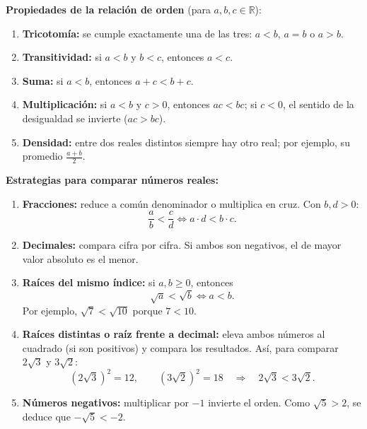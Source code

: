 \documentclass[12pt, letterpaper]{article}
\begin{document}
\begin{cuadroteoria}
  \textbf{Propiedades de la relación de orden} (para $a, b, c \in \mathbb{R}$):
  \begin{enumerate}[leftmargin=*, label=\arabic*.]
    \item \textbf{Tricotomía:} se cumple exactamente una de las tres: $a < b$, $a = b$ o $a > b$.
    \item \textbf{Transitividad:} si $a < b$ y $b < c$, entonces $a < c$.
    \item \textbf{Suma:} si $a < b$, entonces $a + c < b + c$.
    \item \textbf{Multiplicación:} si $a < b$ y $c > 0$, entonces $ac < bc$; si $c < 0$, el sentido de la desigualdad se invierte ($ac > bc$).
    \item \textbf{Densidad:} entre dos reales distintos siempre hay otro real; por ejemplo, su promedio $\frac{a+b}{2}$.
  \end{enumerate}
\end{cuadroteoria}

\begin{cuadrosolucion}
  \textbf{Estrategias para comparar números reales:}
  \begin{enumerate}[leftmargin=*, label=\arabic*.]
    \item \textbf{Fracciones:} reduce a común denominador o multiplica en cruz. Con $b, d > 0$:
          $$\frac{a}{b} < \frac{c}{d} \iff a \cdot d < b \cdot c.$$

    \item \textbf{Decimales:} compara cifra por cifra. Si ambos son negativos, el de mayor valor absoluto es el menor.

    \item \textbf{Raíces del mismo índice:} si $a, b \geq 0$, entonces
          $$\sqrt{a} < \sqrt{b} \iff a < b.$$
          Por ejemplo, $\sqrt{7} < \sqrt{10}$ porque $7 < 10$.

    \item \textbf{Raíces distintas o raíz frente a decimal:} eleva ambos números al cuadrado (si son positivos) y compara los resultados. Así, para comparar $2\sqrt{3}$ y $3\sqrt{2}$:
          $$(2\sqrt{3})^2 = 12, \qquad (3\sqrt{2})^2 = 18 \quad\Rightarrow\quad 2\sqrt{3} < 3\sqrt{2}.$$

    \item \textbf{Números negativos:} multiplicar por $-1$ invierte el orden. Como $\sqrt{5} > 2$, se deduce que $-\sqrt{5} < -2$.
  \end{enumerate}
\end{cuadrosolucion}
\end{document}
